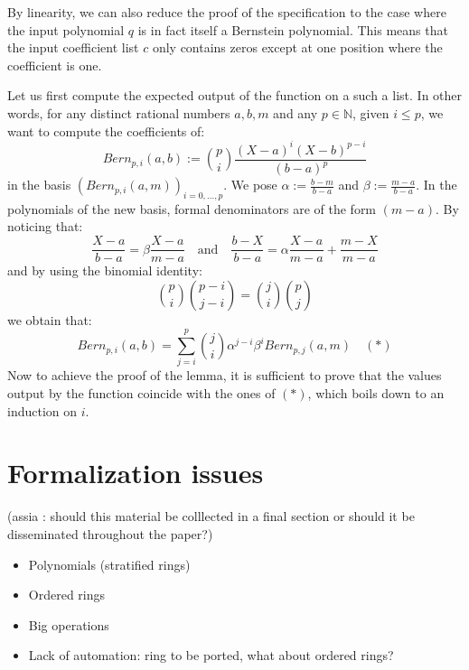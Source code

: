 \documentclass{mscs}
\begin{document}
By linearity, we can also reduce the proof of the 
specification to the case where the input polynomial $q$ is in fact
itself a Bernstein polynomial. This means that the input coefficient
list $c$ only contains zeros except at one position where the
coefficient is one.

Let us first compute the expected output of the  function on
a such a list. In other words, for any distinct rational numbers $a,
b, m$ and any $p\in \mathbb{N}$, given $i \leq p$, we want to compute
the coefficients of:
$$Bern_{p, i}(a, b) := \binom{p}{i} \frac{(X - a)^i(X - b)^{p -i}}
{(b  - a)^p}$$ in the basis $(Bern_{p, i}(a, m))_{i = 0, \dots, p}$.
We pose
$\alpha := \frac{b -  m}{b - a}$ and $\beta := \frac{m - a}{b - a}$.
In the polynomials of the new basis, formal denominators are of the
form $(m - a)$. By noticing that:
$$\frac{X - a}{b - a} = \beta \frac{X - a}{m - a} \quad \textrm{and} \quad
\frac{b - X}{b - a} = \alpha\frac{X - a}{m - a} +\frac{m - X}{m - a}$$
and by using the binomial identity:
$$\binom{p}{i}\binom{p - i}{j - i}  = \binom{j}{i}\binom{p}{j}$$
we obtain that:
$$Bern_{p, i}(a, b) =
\sum_{j = i}^p\binom{j}{i}\alpha^{j-i}\beta^i Bern_{p, j}(a, m) \quad (*)$$
Now to achieve the proof of the  lemma, it is
sufficient to prove that the values output by the  function
coincide with the ones of $(*)$, which boils down to an induction on $i$.
\section{Formalization issues}

(assia : should this material be colllected in a final section or
should it be disseminated throughout the paper?)

\begin{itemize}
\item Polynomials (stratified rings)
\item Ordered rings
\item Big operations
\item Lack of automation: ring to be ported, what about ordered rings?
\end{itemize}



\end{document}
